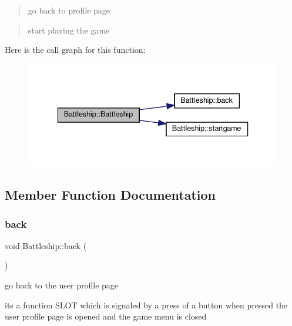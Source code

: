 \begin{quote}
go back to profile page \end{quote}


\begin{quote}
start playing the game \end{quote}
Here is the call graph for this function\+:
\nopagebreak
\begin{figure}[H]
\begin{center}
\leavevmode
\includegraphics[width=336pt]{classBattleship_afe1dd441643011f48c6e89c2c761f556_cgraph}
\end{center}
\end{figure}


\subsection{Member Function Documentation}
\mbox{\label{classBattleship_a37515bbb9fe274e559315cb177fe13e5}} 
\subsubsection{\texorpdfstring{back}{back}}
{\footnotesize\ttfamily void Battleship\+::back (\begin{DoxyParamCaption}{ }\end{DoxyParamCaption})\hspace{0.3cm}{\ttfamily [slot]}}



go back to the user profile page 

its a function S\+L\+OT which is signaled by a press of a button when pressed the user profile page is opened and the game menu is closed

